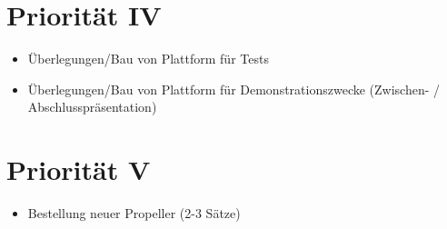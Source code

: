 \documentclass[12pt,a4paper]{article}
\begin{document}
\section{Priorität IV}

\begin{itemize}
	\item Überlegungen/Bau von Plattform für Tests
	\item Überlegungen/Bau von Plattform für Demonstrationszwecke (Zwischen- / Abschlusspräsentation)
\end{itemize}

\section{Priorität V}

\begin{itemize}
	\item Bestellung neuer Propeller (2-3 Sätze)
\end{itemize}
\end{document}
